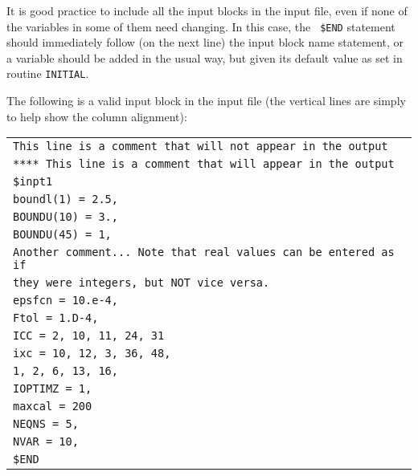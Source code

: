 \documentclass[11pt,a4paper]{report}
\begin{document}
It is good practice to include all the input blocks in the input file, even if
none of the variables in some of them need changing. In this case, the {\tt
\$END}
 statement should immediately follow (on the next line) the input block
name statement, or a variable should be added in the usual way, but given its
default value as set in routine {\tt INITIAL}.

The following is a valid input block in the input file (the vertical lines
are simply to help show the column alignment):
\begin{center}
\begin{tabular}{||l}
$\!\!$\tt * This line is a comment that will not appear in the output \\
$\!\!$\tt ***** This line is a comment that will appear in the output \\
$\!\!$\tt \$inpt1                      \\ %
$\!\!$\tt boundl(1) = 2.5,             \\
$\!\!$\tt BOUNDU(10) = 3.,             \\
$\!\!$\tt BOUNDU(45) = 1,              \\
$\!\!$\tt * Another comment... Note that real values can be entered as if \\
$\!\!$\tt * they were integers, but NOT vice versa. \\
$\!\!$\tt epsfcn = 10.e-4,             \\
$\!\!$\tt Ftol = 1.D-4,                \\
$\!\!$\tt ICC =   2, 10, 11, 24, 31    \\
$\!\!$\tt ixc =   10, 12, 3, 36, 48,   \\
$\!\!$\hspace{15mm}\tt 1, 2, 6, 13, 16,\\
$\!\!$\tt IOPTIMZ = 1,                 \\
$\!\!$\tt maxcal = 200                 \\
$\!\!$\tt NEQNS = 5,                   \\
$\!\!$\tt NVAR = 10,                   \\
$\!\!$\tt \$END                        \\  %
\end{tabular}
\end{center}
\end{document}
